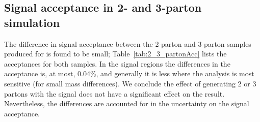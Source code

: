 \subsection{Signal acceptance in 2- and 3-parton simulation}

The difference in signal acceptance between the 2-parton and 3-parton samples produced for \ttwocc 
is found to be small; Table~\ref{tab:2_3_partonAcc} lists the acceptances for both samples.
In the signal regions the differences in the acceptance is, at most, 0.04\%, 
and generally it is less where the analysis is most sensitive (for small mass differences).
We conclude the effect of generating 2 or 3 partons with the signal does not have a significant effect on the result.
Nevertheless, the differences are accounted for in the uncertainty on the signal acceptance.

